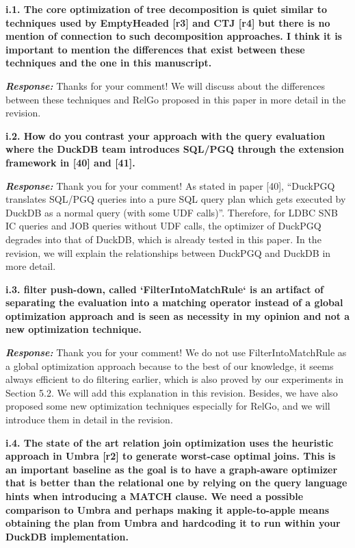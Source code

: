 \textbf{
i.1. The core optimization of tree decomposition is quiet similar to techniques used by EmptyHeaded [r3] and CTJ [r4] but there is no mention of connection to such decomposition approaches. I think it is important to mention the differences that exist between these techniques and the one in this manuscript.}

\textbf{\textit{Response: }}
Thanks for your comment! We will discuss about the differences between these techniques and RelGo proposed in this paper in more detail in the revision.


\textbf{i.2. How do you contrast your approach with the query evaluation where the DuckDB team introduces SQL/PGQ through the extension framework in [40] and [41].}

\textbf{\textit{Response: }}
Thank you for your comment! As stated in paper [40], ``DuckPGQ translates SQL/PGQ queries into a pure SQL query plan which gets executed by DuckDB as a normal query (with some UDF calls)''. Therefore, for LDBC SNB IC queries and JOB queries without UDF calls, the optimizer of DuckPGQ degrades into that of DuckDB, which is already tested in this paper. In the revision, we will explain the relationships between DuckPGQ and DuckDB in more detail.

\textbf{i.3. filter push-down, called `FilterIntoMatchRule` is an artifact of separating the evaluation into a matching operator instead of a global optimization approach and is seen as necessity in my opinion and not a new optimization technique.}

\textbf{\textit{Response: }}
Thank you for your comment! We do not use FilterIntoMatchRule as a global optimization approach because to the best of our knowledge, it seems always efficient to do filtering earlier, which is also proved by our experiments in Section 5.2. We will add this explanation in this revision.
Besides, we have also proposed some new optimization techniques especially for RelGo, and we will introduce them in detail in the revision.


\textbf{
i.4. The state of the art relation join optimization uses the heuristic approach in Umbra [r2] to generate worst-case optimal joins. This is an important baseline as the goal is to have a graph-aware optimizer that is better than the relational one by relying on the query language hints when introducing a MATCH clause. We need a possible comparison to Umbra and perhaps making it apple-to-apple means obtaining the plan from Umbra and hardcoding it to run within your DuckDB implementation.
}

